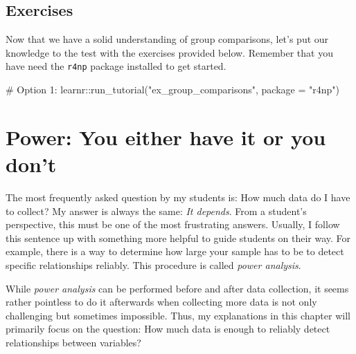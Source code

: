 \documentclass[
  letterpaper,
  DIV=11,
  numbers=noendperiod]{scrreprt}
\newenvironment{Shaded}{\begin{snugshade}}{\end{snugshade}}
\newcommand{\AttributeTok}[1]{\textcolor[rgb]{0.40,0.45,0.13}{#1}}
\newcommand{\CommentTok}[1]{\textcolor[rgb]{0.37,0.37,0.37}{#1}}
\newcommand{\FunctionTok}[1]{\textcolor[rgb]{0.28,0.35,0.67}{#1}}
\newcommand{\NormalTok}[1]{\textcolor[rgb]{0.00,0.23,0.31}{#1}}
\newcommand{\SpecialCharTok}[1]{\textcolor[rgb]{0.37,0.37,0.37}{#1}}
\newcommand{\StringTok}[1]{\textcolor[rgb]{0.13,0.47,0.30}{#1}}
\begin{document}
\section{Exercises}\label{sec-exercises-group-comparisons}

Now that we have a solid understanding of group comparisons, let's put
our knowledge to the test with the exercises provided below. Remember
that you have need the \texttt{r4np} package installed to get started.

\begin{Shaded}
\begin{Highlighting}[]
\CommentTok{\# Option 1:}
\NormalTok{learnr}\SpecialCharTok{::}\FunctionTok{run\_tutorial}\NormalTok{(}\StringTok{"ex\_group\_comparisons"}\NormalTok{, }\AttributeTok{package =} \StringTok{"r4np"}\NormalTok{)}
\end{Highlighting}
\end{Shaded}


\chapter{Power: You either have it or you
don't}\label{sec-power-analysis}

The most frequently asked question by my students is: How much data do I
have to collect? My answer is always the same: \emph{It depends}. From a
student's perspective, this must be one of the most frustrating answers.
Usually, I follow this sentence up with something more helpful to guide
students on their way. For example, there is a way to determine how
large your sample has to be to detect specific relationships reliably.
This procedure is called \emph{power analysis}.

While \emph{power analysis} can be performed before and after data
collection, it seems rather pointless to do it afterwards when
collecting more data is not only challenging but sometimes impossible.
Thus, my explanations in this chapter will primarily focus on the
question: How much data is enough to reliably detect relationships
between variables?
\end{document}
